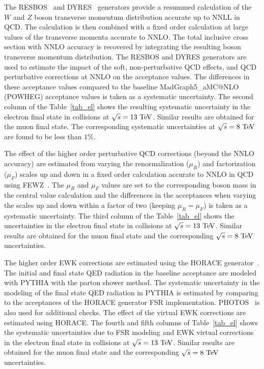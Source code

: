 The RESBOS~\cite{resbos} and DYRES~\cite{dyres,dyres2} generators provide a resummed calculation of the $W$ and $Z$ boson transverse momentum distribution accurate up to NNLL in QCD. The calculation is then combined with a fixed order calculation at large values of the transverse momenta accurate to NNLO. The total inclusive cross section with NNLO accuracy is recovered by integrating the resulting boson transverse momentum distribution. The RESBOS and DYRES generators are used to estimate the impact of the soft, non-perturbative QCD effects, and QCD perturbative corrections at NNLO on the acceptance values. The differences in these acceptance values compared to the baseline MadGraph5\_aMC@NLO (POWHEG) acceptance values is taken as a systematic uncertainty.  The second column of the Table~\ref{tab_el} shows the resulting systematic uncertainty in the electron final state in collisions at $\sqrt{s}=13~\mathrm{Te\kern -0.1em V}$. Similar results are obtained for the muon final state. The corresponding systematic uncertainties at $\sqrt{s}=8~\mathrm{Te\kern -0.1em V}$ are found to be less than $1\%$. 

The effect of the higher order perturbative QCD corrections (beyond the NNLO accuracy) are estimated from varying the renormalization ($\mu_{R}$) and factorization ($\mu_F$) scales up and down in a fixed order calculation accurate to NNLO in QCD using FEWZ~\cite{Gavin:2010az,Gavin:2012sy,Li:2012wna}. The $\mu_R$ and $\mu_F$ values are set to the corresponding boson mass in the central value calculation and the differences in the acceptances when varying the scales up and down within a factor of two (keeping $\mu_R=\mu_F$) is taken as a systematic uncertainty. The third column of the Table~\ref{tab_el} shows the uncertainties in the electron final state in collisions at $\sqrt{s}=13~\mathrm{Te\kern -0.1em V}$. Similar results are obtained for the muon final state and the corresponding $\sqrt{s}=8~\mathrm{Te\kern -0.1em V}$ uncertainties.    

The higher order EWK corrections are estimated using the HORACE generator~\cite{Calame:608890,CarloniCalame:2005vc,CarloniCalame:2006zq,CarloniCalame:2007cd}. The initial and final state QED radiation in the baseline acceptance are modeled with PYTHIA with the parton shower method. The systematic uncertainty in the modeling of the final state QED radiation in PYTHIA is estimated by comparing to the acceptances of the HORACE generator FSR implementation. PHOTOS~\cite{photos} is also used for additional checks. The effect of the virtual EWK corrections are estimated using HORACE. The fourth and fifth columns of Table~\ref{tab_el} shows the systematic uncertainties due to FSR modeling and EWK virtual corrections in the electron final state in collisions at $\sqrt{s}=13~\mathrm{Te\kern -0.1em V}$. Similar results are obtained for the muon final state and the corresponding $\sqrt{s}=8~\mathrm{Te\kern -0.1em V}$ uncertainties. 

